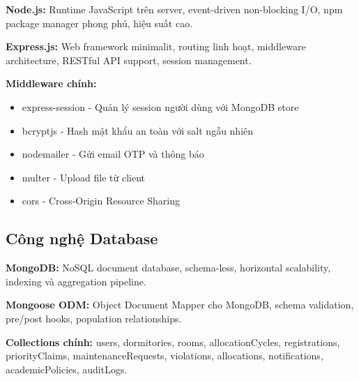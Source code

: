 \documentclass[12pt,a4paper]{article}
\begin{document}
\textbf{Node.js:} Runtime JavaScript trên server, event-driven non-blocking I/O, npm package manager phong phú, hiệu suất cao.

\textbf{Express.js:} Web framework minimalit, routing linh hoạt, middleware architecture, RESTful API support, session management.

\textbf{Middleware chính:}
\begin{itemize}
  \item express-session - Quản lý session người dùng với MongoDB store
  \item bcryptjs - Hash mật khẩu an toàn với salt ngẫu nhiên
  \item nodemailer - Gửi email OTP và thông báo
  \item multer - Upload file từ client
  \item cors - Cross-Origin Resource Sharing
\end{itemize}

\subsection{Công nghệ Database}

\textbf{MongoDB:} NoSQL document database, schema-less, horizontal scalability, indexing và aggregation pipeline.

\textbf{Mongoose ODM:} Object Document Mapper cho MongoDB, schema validation, pre/post hooks, population relationships.

\textbf{Collections chính:} users, dormitories, rooms, allocationCycles, registrations, priorityClaims, maintenanceRequests, violations, allocations, notifications, academicPolicies, auditLogs.
\end{document}
